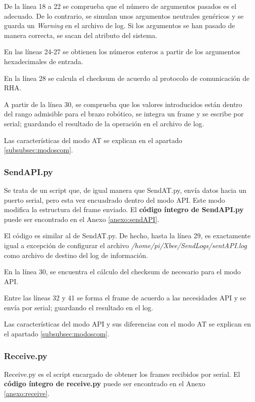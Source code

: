 De la línea 18 a 22 se comprueba que el número de argumentos pasados es el adecuado. De lo contrario, se simulan unos argumentos neutrales genéricos y se guarda un \textit{Warning} en el archivo de log. Si los argumentos se han pasado de manera correcta, se sacan del atributo del sistema.

En las líneas 24-27 se obtienen los números enteros a partir de los argumentos hexadecimales de entrada.

En la línea 28 se calcula el checksum de acuerdo al protocolo de comunicación de RHA.

A partir de la línea 30, se comprueba que los valores introducidos están dentro del rango admisible para el brazo robótico, se integra un frame y se escribe por serial; guardando el resultado de la operación en el archivo de log.

Las características del modo AT se explican en el apartado \ref{subsubsec:modoscom}.

\subsubsection{SendAPI.py}\label{subsubsec:sendapi}

Se trata de un script que, de igual manera que SendAT.py, envía datos hacia un puerto serial, pero esta vez encuadrado dentro del modo API. Este modo modifica la estructura del frame enviado. El \textbf{código íntegro de SendAPI.py} puede ser encontrado en el Anexo \ref{anexo:sendAPI}.

El código es similar al de SendAT.py. De hecho, hasta la línea 29, es exactamente igual a excepción de configurar el archivo \textit{/home/pi/Xbee/SendLogs/sentAPI.log} como archivo de destino del log de información.

En la línea 30, se encuentra el cálculo del checksum de necesario para el modo API.

Entre las líneas 32 y 41 se forma el frame de acuerdo a las necesidades API y se envía por serial; guardando el resultado en el log.

Las características del modo API y sus diferencias con el modo AT se explican en el apartado \ref{subsubsec:modoscom}.

\subsubsection{Receive.py}\label{subsubsec:receive}

Receive.py es el script encargado de obtener los frames recibidos por serial. El \textbf{código íntegro de receive.py} puede ser encontrado en el Anexo \ref{anexo:receive}.

